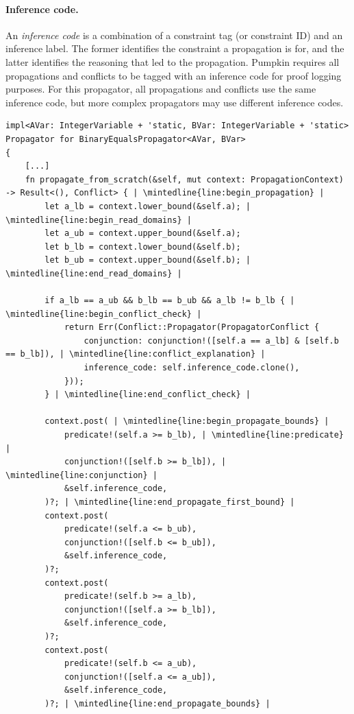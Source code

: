 \documentclass{article}
\begin{document}
    \paragraph{Inference code.}
        An \emph{inference code} is a combination of a constraint tag (or constraint ID) and an inference label.
        The former identifies the constraint a propagation is for, and the latter identifies the reasoning that led to the propagation.
        Pumpkin requires all propagations and conflicts to be tagged with an inference code for proof logging purposes.
        For this propagator, all propagations and conflicts use the same inference code, but more complex propagators may use different inference codes.
\begin{listing}[H]
    \begin{verbatim}
impl<AVar: IntegerVariable + 'static, BVar: IntegerVariable + 'static> Propagator for BinaryEqualsPropagator<AVar, BVar>
{
    [...]
    fn propagate_from_scratch(&self, mut context: PropagationContext) -> Result<(), Conflict> { | \mintedline{line:begin_propagation} |
        let a_lb = context.lower_bound(&self.a); | \mintedline{line:begin_read_domains} |
        let a_ub = context.upper_bound(&self.a);
        let b_lb = context.lower_bound(&self.b);
        let b_ub = context.upper_bound(&self.b); | \mintedline{line:end_read_domains} |

        if a_lb == a_ub && b_lb == b_ub && a_lb != b_lb { | \mintedline{line:begin_conflict_check} |
            return Err(Conflict::Propagator(PropagatorConflict {
                conjunction: conjunction!([self.a == a_lb] & [self.b == b_lb]), | \mintedline{line:conflict_explanation} |
                inference_code: self.inference_code.clone(),
            }));
        } | \mintedline{line:end_conflict_check} |

        context.post( | \mintedline{line:begin_propagate_bounds} |
            predicate!(self.a >= b_lb), | \mintedline{line:predicate} |
            conjunction!([self.b >= b_lb]), | \mintedline{line:conjunction} |
            &self.inference_code,
        )?; | \mintedline{line:end_propagate_first_bound} |
        context.post(
            predicate!(self.a <= b_ub),
            conjunction!([self.b <= b_ub]),
            &self.inference_code,
        )?;
        context.post(
            predicate!(self.b >= a_lb),
            conjunction!([self.a >= b_lb]),
            &self.inference_code,
        )?;
        context.post(
            predicate!(self.b <= a_ub),
            conjunction!([self.a <= a_ub]),
            &self.inference_code,
        )?; | \mintedline{line:end_propagate_bounds} |


\end{verbatim}
\end{listing}
\end{document}
